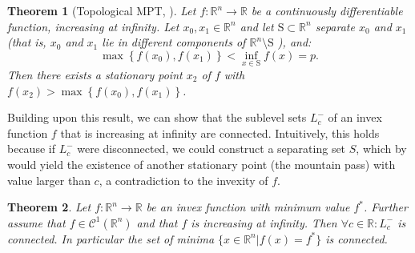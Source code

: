 \documentclass{article}
\newtheorem{theorem}{Theorem}
\newcommand{\R}{\mathbb{R}}
\newcommand{\cC}{\mathcal{C}}
\begin{document}
\begin{theorem}[Topological MPT, \citet{Katriel1994Mountain}]
    \label{thm:katriel}
        Let $f: \R^n \rightarrow \R$ be a continuously differentiable function, increasing at infinity. Let $x_0, x_1 \in \R^n$ and let $\mathrm{S} \subset \R^n$ separate $x_0$ and $x_1$ (that is, $x_0$ and $x_1$ lie in different components of $\R^n\setminus\mathrm{S}$ ), and:
    \[
    \max \left\{f\left(x_0\right), f\left(x_1\right)\right\}<\inf _{x \in \mathrm{S}} f(x)=p.
    \]
    Then there exists a stationary point $x_2$ of $f$ with $f\left(x_2\right)>\max \left\{f\left(x_0\right), f\left(x_1\right)\right\}$.
    \end{theorem}
Building upon this result, we can show that the sublevel sets $L^-_c$ of an invex function $f$ that is increasing at infinity are connected. Intuitively, this holds because if $L^-_c$ were disconnected, we could construct a separating set $S$, which by  would yield the existence of another stationary point (the mountain pass) with value larger than $c$, a contradiction to the invexity of $f$.
\begin{theorem}
\label{thm:main}
   Let $f: \R^n \rightarrow \R $ be an invex function with minimum value $f^*$. Further assume that $f\in \cC^1(\R^n)$ and that $f$ is increasing at infinity.
    Then $\forall c\in \R: L^{-}_c$ is connected. In particular the set of minima $\{x\in \R^n|f(x)=f^*\}$ is connected.
\end{theorem}
\end{document}
